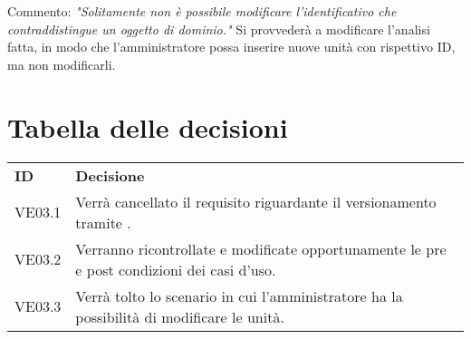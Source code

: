 \documentclass[]{article}
\begin{document}
		\noindent Commento: \textit{"Solitamente non è possibile modificare l’identificativo che contraddistingue un oggetto di dominio."}
		\newline
		Si provvederà a modificare l'analisi fatta, in modo che l'amministratore possa inserire nuove unità con rispettivo ID, ma non modificarli.
		
	\newpage
	
	\section{Tabella delle decisioni}

\begin{table} [h!]
	\begin{center}
		\begin{tabular} { m{2cm} m{14cm} }
			\rowcolor{lightgray}
			\textbf{ID} & \textbf{Decisione}\\
			VE03.1 & Verrà cancellato il requisito riguardante il versionamento tramite \glock{Github}.\\
			VE03.2 & Verranno ricontrollate e modificate opportunamente le pre e post condizioni dei casi d'uso.\\
			VE03.3 & Verrà tolto lo scenario in cui l'amministratore ha la possibilità di modificare le unità.
		\end{tabular}
	\end{center}
\end{table}
\end{document}
